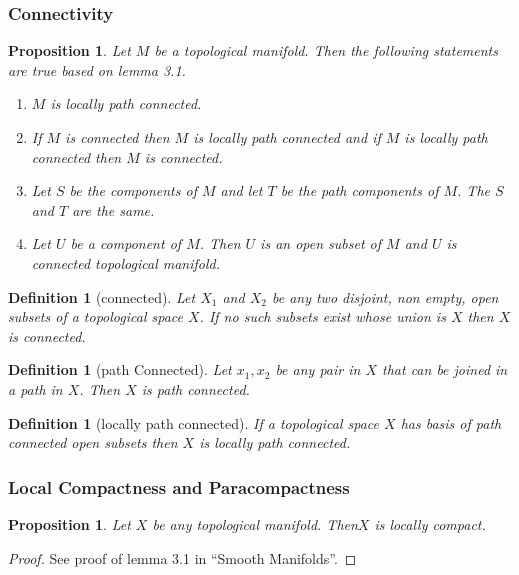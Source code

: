 \documentclass{article}
\newtheorem{proposition}[theorem]{Proposition}
\newtheorem{definition}[theorem]{Definition}
\begin{document}
\subsubsection{Connectivity}
\begin{proposition}
  Let $ M $ be a topological manifold.  Then the following statements are true based on lemma 3.1.
  \begin{enumerate}
  \item $ M $ is locally path connected.
  \item If $ M $ is connected then $ M $ is locally path connected and if $ M $ is locally path connected then $ M $ is connected.
  \item Let $ S $ be the components of $ M $ and let $ T $ be the path components of $ M $. The $ S $ and $ T $ are the same.
  \item Let $ U $ be a component of $ M $. Then $ U $ is an open subset of $ M $ and $ U $ is connected topological manifold.
  \end{enumerate}
\end{proposition}

\begin{definition}[connected]
Let $ X_{1} $ and $  X_{2} $ be any two disjoint, non empty,  open subsets of a topological space $ X $. If no such subsets exist whose union is $ X $ then $ X $ is connected.
\end{definition}
\begin{definition}[path Connected]
  Let $ x_{1}, x_{2} $ be any pair in $ X $ that can be joined in a path in $ X $. Then $ X $ is path connected.
\end{definition}
\begin{definition}[locally path connected]
  If a topological space $ X $ has basis of path connected open subsets then $ X $ is locally path connected.
\end{definition}

\subsubsection{Local Compactness and Paracompactness}
\begin{proposition}
  Let $ X $ be any topological manifold. Then$ X $ is locally compact.
\end{proposition}

\begin{proof}
  See proof of lemma 3.1 in ``Smooth Manifolds''.
\end{proof}
\end{document}
